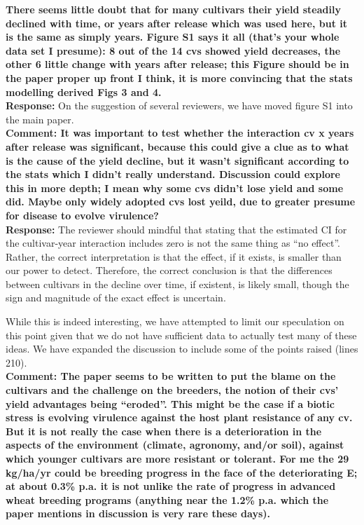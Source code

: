 \documentclass{article} \usepackage[margin=1in]{geometry}
\begin{document}
\textbf{There seems little doubt that for many cultivars their yield
  steadily declined with time, or years after release which was used
  here, but it is the same as simply years. Figure S1 says it all
  (that’s your whole data set I presume): 8 out of the 14 cvs showed
  yield decreases, the other 6 little change with years after release;
  this Figure should be in the paper proper up front I think, it is
  more convincing that the stats modelling derived Figs 3 and 4.}\\

\textbf{Response:} On the suggestion of several reviewers, we have
moved figure S1 into the main paper.\\

\textbf{Comment: It was important to test whether the interaction cv x years after
  release was significant, because this could give a clue as to what is
  the cause of the yield decline, but it wasn’t significant according to
  the stats which I didn’t really understand. Discussion could explore
  this in more depth; I mean why some cvs didn’t lose yield and some
  did. Maybe only widely adopted cvs lost yeild, due to greater presume
  for disease to evolve virulence?}\\

\textbf{Response:} The reviewer should mindful that
stating that the estimated CI for the cultivar-year interaction
includes zero is not the same thing as ``no
effect''. Rather, the correct interpretation is that the effect, if it
exists, is smaller than our power to detect. Therefore, the correct
conclusion is that the differences between cultivars in the decline
over time, if existent, is likely small, though the sign and magnitude of the exact
effect is uncertain.

While this is indeed interesting, we
have attempted to limit our speculation on this point given that we do not have
sufficient data to actually test many of these ideas. We have expanded
the discussion to include some of the points raised (lines 210). \\

\textbf{Comment: The paper seems to be written to put the blame on the cultivars and
  the challenge on the breeders, the notion of their cvs’ yield
  advantages being “eroded”. This might be the case if a biotic stress
  is evolving virulence against the host plant resistance of any cv.
  But it is not really the case when there is a deterioration in the
  aspects of the environment (climate, agronomy, and/or soil), against
  which younger cultivars are more resistant or tolerant.  For me the 29
  kg/ha/yr could be breeding progress in the face of the deteriorating
  E; at about 0.3\% p.a. it is not unlike the rate of progress in
  advanced wheat breeding programs (anything near the 1.2\% p.a. which
  the paper mentions in discussion is very rare these days).}\\
\end{document}
